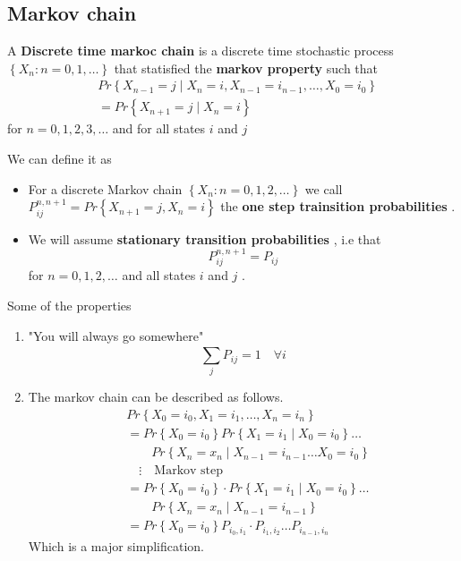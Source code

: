 \documentclass{article}
\theoremstyle{remark}
\begin{document}
\subsection{Markov chain}%
\label{sub:markov_chain}


\begin{definition}
  A \textbf{ Discrete time markoc chain}  is a discrete time stochastic process $\left\{ X_{n} : n = 0,1,\ldots \right\}$ that statisfied the \textbf{markov property}  such that \[
  \begin{split}
       & Pr \left \{ X_{n-1} = j  \mid  X_{n} = i ,    X_{n-1} = i_{n-1} , \ldots, X_{0} = i_{0} \right \}  \\
    &=  Pr \left \{ X_{n+1} = j  \mid  X_{n} = i \right \}  
  \end{split} 
  \] 
  for $n = 0,1,2,3, \ldots$ and for all states $i$ and $j$
\end{definition}

\begin{definition}
  We can define it  as 
  \begin{itemize}
    \item For a discrete Markov chain $\left\{ X_{n}: n= 0,1,2, \ldots \right\}$ we call $P_{ij}^{n, n+1} = Pr \left \{ X_{n+1} = j , X_{n} =i \right \} $ the \textbf{one step trainsition probabilities} . 
    \item We will assume \textbf{stationary transition probabilities} , i.e that \[
    P_{ij}^{n, n+1} = P_{ij}
    \]   for $n = 0,1,2, \ldots$ and all states $i $ and $j$ . 
  \end{itemize}
\end{definition}

Some of the properties 
\begin{enumerate}
  \item "You will always go somewhere" \[
  \sum_{j}^{}  P_{ij} = 1 \quad  \forall i 
  \] 
\item The markov chain can be described as follows. \[
    \begin{split}
  & Pr \left \{ X_{0} = i_{0} , X_{1} = i_{1}, \ldots, X_{n} = i_{n} \right \}   \\
 &=  Pr \left \{ X_{0} = i_{0}  \right \}   Pr \left \{ X_{1} = i_{1}  \mid  X_{0} = i_{0} \right \}   \ldots \\
     & \quad \quad    Pr \left \{ X_{n} = x_{n}  \mid  X_{n-1} = i_{n-1} \ldots X_{0} = i_{0} \right \}  \\
  &  \quad \vdots \quad     \text{Markov step} \\
 &=  Pr \left \{ X_{0} = i_{0}  \right \}  \cdot  Pr \left \{ X_{1} = i_{1}  \mid X_{0} = i_{0} \right \} \ldots \\
  & \quad \quad    Pr \left \{ X_{n} = x_{n}  \mid  X_{n-1} = i_{n-1} \right \}   \\
 &=  Pr \left \{ X_{0} = i_{0}  \right \} P_{i_{0}, i_{1}} \cdot  P_{i_{1}, i_{2}} \ldots P_{i_{n-1}, i_{n}}
    \end{split} 
\] 
Which is a major simplification.
\end{enumerate}
\end{document}
